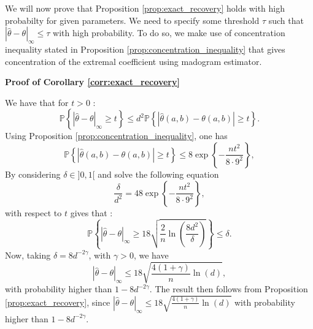 \documentclass[11pt]{article}
\makeatletter
\theoremstyle{definition}
\renewenvironment{proof}[1][\proofname]{\par
\pushQED{\qed}%
\normalfont \topsep6\p@\@plus6\p@\relax
\trivlist
\item\relax
{\textbf{
#1\@addpunct{ }}}\hspace\labelsep\ignorespaces
}{%
\popQED\endtrivlist\@endpefalse
}
\makeatother
\begin{document}
	We will now prove that Proposition \ref{prop:exact_recovery} holds with high probabilty for given parameters. We need to specify some threshold $\tau$ such that $|\hat{\theta} - \theta|_{\infty} \leq \tau$ with high probability. To do so, we make use of concentration inequality stated in Proposition \ref{prop:concentration_inequality} that gives concentration of the extremal coefficient using madogram estimator.
	
	\begin{proof}[Proof of Corollary \ref{corr:exact_recovery}]
		We have that for $t>0$ :
		\begin{equation*}
			\mathbb{P}\left\{ |\hat{\theta} - \theta|_{\infty} \geq t \right\} \leq d^2 \mathbb{P}\left\{|\hat{\theta}(a,b) - \theta(a,b)| \geq t \right\}.
		\end{equation*}
		Using Proposition \ref{prop:concentration_inequality}, one has 
		\begin{equation*}
			\mathbb{P}\left\{|\hat{\theta}(a,b) - \theta(a,b)| \geq t \right\} \leq 8 \exp\left\{ - \frac{nt^2}{8 \cdot 9^2} \right\},
		\end{equation*}
		By considering $\delta \in ]0,1[$ and solve the following equation
		\begin{equation*}
			\frac{\delta}{d^2} = 4 8 \exp\left\{ - \frac{nt^2}{8 \cdot 9^2}\right\},
		\end{equation*}
		with respect to $t$ gives that :
		\begin{equation*}
			\mathbb{P}\left\{ |\hat{\theta} - \theta|_{\infty} \geq 18 \sqrt{\frac{2}{n} \ln\left( \frac{8 d^2}{\delta} \right)} \right\} \leq \delta.
		\end{equation*}
		Now, taking $\delta = 8d^{-2\gamma}$, with $\gamma > 0$, we have
		\begin{equation*}
			|\hat{\theta} - \theta|_{\infty} \leq 18 \sqrt{\frac{4(1+\gamma)}{n} \ln\left( d \right)},
		\end{equation*}
		with probability higher than $1 - 
		8d^{-2\gamma}$. The result then follows from Proposition \ref{prop:exact_recovery}, since $|\hat{\theta} - \theta|_{\infty} \leq 18 \sqrt{\frac{4(1+\gamma)}{n} \ln(d)}$ with probability higher than $1-8d^{-2\gamma}$.
	\end{proof}
	
\end{document}
